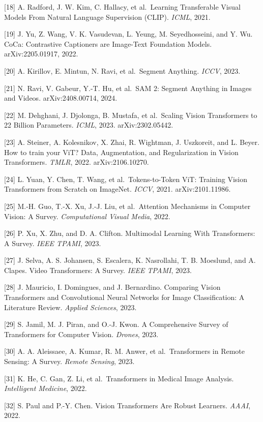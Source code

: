{[}18{]} A. Radford, J. W. Kim, C. Hallacy, et al.~Learning Transferable Visual Models From Natural Language Supervision (CLIP). \emph{ICML}, 2021.

{[}19{]} J. Yu, Z. Wang, V. K. Vasudevan, L. Yeung, M. Seyedhosseini, and Y. Wu. CoCa: Contrastive Captioners are Image-Text Foundation Models. arXiv:2205.01917, 2022.

{[}20{]} A. Kirillov, E. Mintun, N. Ravi, et al.~Segment Anything. \emph{ICCV}, 2023.

{[}21{]} N. Ravi, V. Gabeur, Y.-T. Hu, et al.~SAM 2: Segment Anything in Images and Videos. arXiv:2408.00714, 2024.

{[}22{]} M. Dehghani, J. Djolonga, B. Mustafa, et al.~Scaling Vision Transformers to 22 Billion Parameters. \emph{ICML}, 2023. arXiv:2302.05442.

{[}23{]} A. Steiner, A. Kolesnikov, X. Zhai, R. Wightman, J. Uszkoreit, and L. Beyer. How to train your ViT? Data, Augmentation, and Regularization in Vision Transformers. \emph{TMLR}, 2022. arXiv:2106.10270.

{[}24{]} L. Yuan, Y. Chen, T. Wang, et al.~Tokens-to-Token ViT: Training Vision Transformers from Scratch on ImageNet. \emph{ICCV}, 2021. arXiv:2101.11986.

{[}25{]} M.-H. Guo, T.-X. Xu, J.-J. Liu, et al.~Attention Mechanisms in Computer Vision: A Survey. \emph{Computational Visual Media}, 2022.

{[}26{]} P. Xu, X. Zhu, and D. A. Clifton. Multimodal Learning With Transformers: A Survey. \emph{IEEE TPAMI}, 2023.

{[}27{]} J. Selva, A. S. Johansen, S. Escalera, K. Nasrollahi, T. B. Moeslund, and A. Clapes. Video Transformers: A Survey. \emph{IEEE TPAMI}, 2023.

{[}28{]} J. Mauricio, I. Domingues, and J. Bernardino. Comparing Vision Transformers and Convolutional Neural Networks for Image Classification: A Literature Review. \emph{Applied Sciences}, 2023.

{[}29{]} S. Jamil, M. J. Piran, and O.-J. Kwon. A Comprehensive Survey of Transformers for Computer Vision. \emph{Drones}, 2023.

{[}30{]} A. A. Aleissaee, A. Kumar, R. M. Anwer, et al.~Transformers in Remote Sensing: A Survey. \emph{Remote Sensing}, 2023.

{[}31{]} K. He, C. Gan, Z. Li, et al.~Transformers in Medical Image Analysis. \emph{Intelligent Medicine}, 2022.

{[}32{]} S. Paul and P.-Y. Chen. Vision Transformers Are Robust Learners. \emph{AAAI}, 2022.

